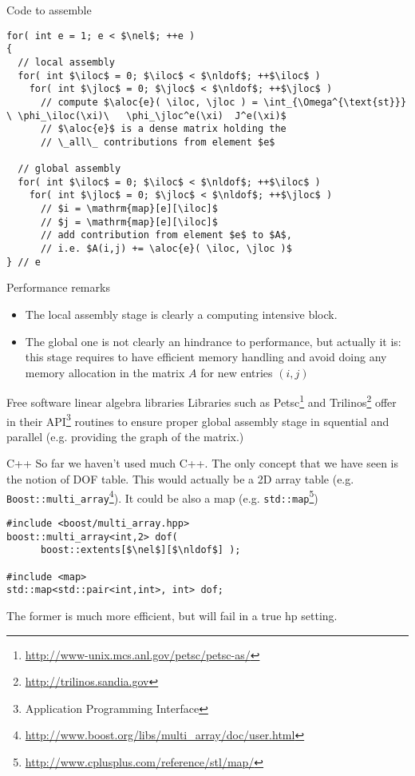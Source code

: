 \begin{frame}[containsverbatim]{Code to assemble}
  \begin{lstlisting}[mathescape,texcl]
for( int e = 1; e < $\nel$; ++e )
{
  // local assembly
  for( int $\iloc$ = 0; $\iloc$ < $\nldof$; ++$\iloc$ )
    for( int $\jloc$ = 0; $\jloc$ < $\nldof$; ++$\jloc$ )
      // compute $\aloc{e}( \iloc, \jloc ) = \int_{\Omega^{\text{st}}} \ \phi_\iloc(\xi)\   \phi_\jloc^e(\xi)  J^e(\xi)$
      // $\aloc{e}$ is a dense matrix holding the 
      // \_all\_ contributions from element $e$
  
  // global assembly      
  for( int $\iloc$ = 0; $\iloc$ < $\nldof$; ++$\iloc$ )
    for( int $\jloc$ = 0; $\jloc$ < $\nldof$; ++$\jloc$ )
      // $i = \mathrm{map}[e][\iloc]$
      // $j = \mathrm{map}[e][\iloc]$
      // add contribution from element $e$ to $A$, 
      // i.e. $A(i,j) += \aloc{e}( \iloc, \jloc )$
} // e
  \end{lstlisting}
\end{frame}

\begin{frame}{Performance remarks}
  
  \begin{itemize}
  \item The local assembly stage is clearly a computing intensive block. 
  \item The global one is not clearly an hindrance to performance, but
    actually it is: this stage requires to have efficient memory
    handling and avoid doing any memory allocation in the matrix $A$ for new entries $(i,j)$
  \end{itemize}
  \begin{block}{Free software linear algebra libraries}
    Libraries such as
    Petsc\footnote{\url{http://www-unix.mcs.anl.gov/petsc/petsc-as/}}
    and Trilinos\footnote{\url{http://trilinos.sandia.gov}} offer in
    their API\footnote{Application Programming Interface} routines to ensure proper global assembly stage in
    squential and parallel (e.g. providing the graph of the matrix.)
  \end{block}
\end{frame}

\begin{frame}[containsverbatim]{C++}
  So far we haven't used much C++. The only concept that we have seen
  is the notion of DOF table. This would actually be a 2D array table
  (e.g. \lstinline{Boost::multi_array}\footnote{\url{http://www.boost.org/libs/multi_array/doc/user.html}}). It could be also a map
  (e.g. \lstinline{std::map}\footnote{\url{http://www.cplusplus.com/reference/stl/map/}})
  
  \begin{lstlisting}[mathescape]
#include <boost/multi_array.hpp>
boost::multi_array<int,2> dof( 
      boost::extents[$\nel$][$\nldof$] );

#include <map>
std::map<std::pair<int,int>, int> dof;
  \end{lstlisting}
  The former is much more efficient, but will fail in a true hp setting. 
\end{frame}
